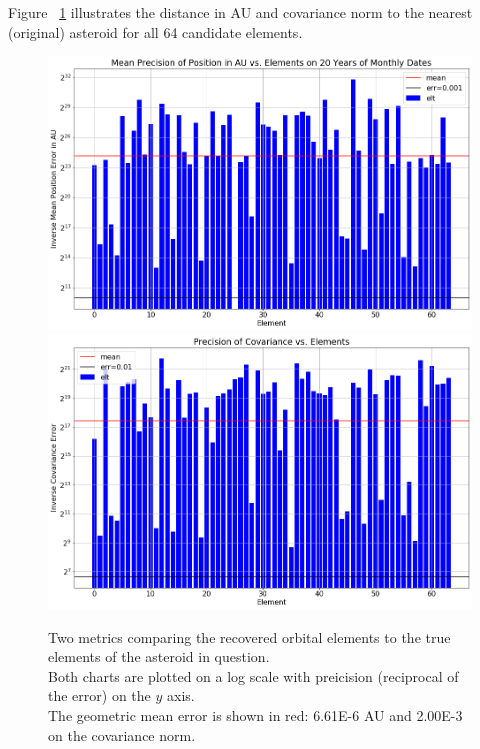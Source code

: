 Figure ~\ref{fig:UnperturbedNearAst} illustrates the distance in AU and covariance norm to the nearest (original) asteroid for all 64 candidate elements.
\begin{figure}[h]
\begin{center}
\includegraphics[width=1.0\textwidth]{../figs/search_known/unperturbed/near_ast_dist.png}
\includegraphics[width=1.0\textwidth]{../figs/search_known/unperturbed/near_ast_cov.png}
\end{center}
\caption{Two metrics comparing the recovered orbital elements to the true elements of the asteroid in question.\\
Both charts are plotted on a log scale with preicision (reciprocal of the error) on the $y$ axis.\\
The geometric mean error is shown in red: 6.61E-6 AU and 2.00E-3 on the covariance norm.}
\label{fig:UnperturbedNearAst}
\end{figure}
\clearpage


